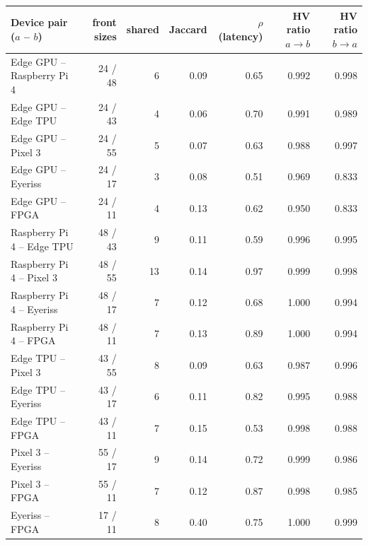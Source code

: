 \begin{tabular}{@{}lrrrrrr@{}}
\toprule
Device pair ($a$ -- $b$) & front sizes & shared & Jaccard & $\rho$(latency) & HV ratio $a\to b$ & HV ratio $b\to a$\\
\midrule
Edge GPU -- Raspberry Pi 4 & 24 / 48 & 6 & 0.09 & 0.65 & 0.992 & 0.998\\
Edge GPU -- Edge TPU & 24 / 43 & 4 & 0.06 & 0.70 & 0.991 & 0.989\\
Edge GPU -- Pixel 3 & 24 / 55 & 5 & 0.07 & 0.63 & 0.988 & 0.997\\
Edge GPU -- Eyeriss & 24 / 17 & 3 & 0.08 & 0.51 & 0.969 & 0.833\\
Edge GPU -- FPGA & 24 / 11 & 4 & 0.13 & 0.62 & 0.950 & 0.833\\
Raspberry Pi 4 -- Edge TPU & 48 / 43 & 9 & 0.11 & 0.59 & 0.996 & 0.995\\
Raspberry Pi 4 -- Pixel 3 & 48 / 55 & 13 & 0.14 & 0.97 & 0.999 & 0.998\\
Raspberry Pi 4 -- Eyeriss & 48 / 17 & 7 & 0.12 & 0.68 & 1.000 & 0.994\\
Raspberry Pi 4 -- FPGA & 48 / 11 & 7 & 0.13 & 0.89 & 1.000 & 0.994\\
Edge TPU -- Pixel 3 & 43 / 55 & 8 & 0.09 & 0.63 & 0.987 & 0.996\\
Edge TPU -- Eyeriss & 43 / 17 & 6 & 0.11 & 0.82 & 0.995 & 0.988\\
Edge TPU -- FPGA & 43 / 11 & 7 & 0.15 & 0.53 & 0.998 & 0.988\\
Pixel 3 -- Eyeriss & 55 / 17 & 9 & 0.14 & 0.72 & 0.999 & 0.986\\
Pixel 3 -- FPGA & 55 / 11 & 7 & 0.12 & 0.87 & 0.998 & 0.985\\
Eyeriss -- FPGA & 17 / 11 & 8 & 0.40 & 0.75 & 1.000 & 0.999\\
\bottomrule
\end{tabular}
